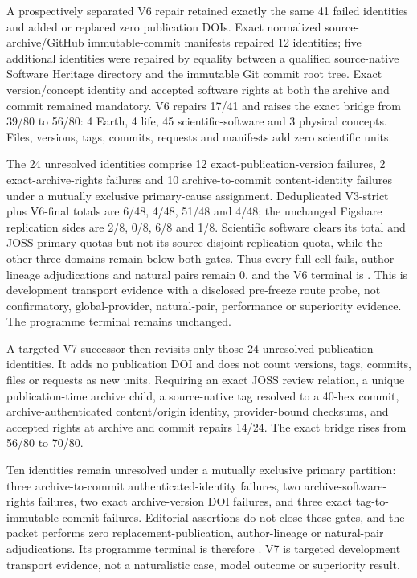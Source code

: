 A prospectively separated V6 repair retained exactly the same 41 failed
identities and added or replaced zero publication DOIs. Exact normalized
source-archive/GitHub immutable-commit manifests repaired 12 identities; five
additional identities were repaired by equality between a qualified
source-native Software Heritage directory and the immutable Git commit root
tree. Exact version/concept identity and accepted software rights at both the
archive and commit remained mandatory. V6 repairs 17/41 and raises the exact
bridge from 39/80 to 56/80: 4 Earth, 4 life, 45 scientific-software and 3
physical concepts. Files, versions, tags, commits, requests and manifests add
zero scientific units.

The 24 unresolved identities comprise 12 exact-publication-version failures,
2 exact-archive-rights failures and 10 archive-to-commit content-identity
failures under a mutually exclusive primary-cause assignment. Deduplicated
V3-strict plus V6-final totals are 6/48, 4/48, 51/48 and 4/48; the unchanged
Figshare replication sides are 2/8, 0/8, 6/8 and 1/8. Scientific software
clears its total and JOSS-primary quotas but not its source-disjoint replication
quota, while the other three domains remain below both gates. Thus every full
cell fails, author-lineage adjudications and natural pairs remain 0, and the
V6 terminal is
.
This is development transport evidence with a disclosed pre-freeze route probe,
not confirmatory, global-provider, natural-pair, performance or superiority
evidence. The programme terminal remains unchanged.

A targeted V7 successor then revisits only those 24 unresolved publication
identities. It adds no publication DOI and does not count versions, tags,
commits, files or requests as new units. Requiring an exact JOSS review relation,
a unique publication-time archive child, a source-native tag resolved to a
40-hex commit, archive-authenticated content/origin identity, provider-bound
checksums, and accepted rights at archive and commit repairs 14/24. The exact
bridge rises from 56/80 to 70/80.

Ten identities remain unresolved under a mutually exclusive primary partition:
three archive-to-commit authenticated-identity failures, two archive-software-
rights failures, two exact archive-version DOI failures, and three exact
tag-to-immutable-commit failures. Editorial assertions do not close these gates,
and the packet performs zero replacement-publication, author-lineage or
natural-pair adjudications. Its programme terminal is therefore
. V7 is targeted development
transport evidence, not a naturalistic case, model outcome or superiority
result.

